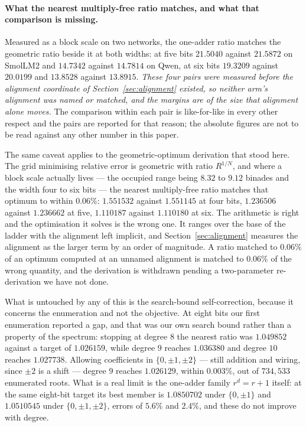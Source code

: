 \documentclass[11pt]{article}
\theoremstyle{definition}
\begin{document}
\paragraph{What the nearest multiply-free ratio matches, and what that
comparison is missing.} Measured as a block scale on two networks, the one-adder
ratio matches the geometric ratio beside it at both widths: at five bits
$21.5040$ against $21.5872$ on SmolLM2 and $14.7342$ against $14.7814$ on Qwen,
at six bits $19.3209$ against $20.0199$ and $13.8528$ against $13.8915$.
\emph{These four pairs were measured before the alignment coordinate of
Section~\ref{sec:alignment} existed, so neither arm's alignment was named or
matched, and the margins are of the size that alignment alone moves.} The
comparison within each pair is like-for-like in every other respect and the pairs
are reported for that reason; the absolute figures are not to be read against any
other number in this paper.

The same caveat applies to the geometric-optimum derivation that stood here. The
grid minimising relative error is geometric with ratio $R^{1/N}$, and where a
block scale actually lives --- the occupied range being $8.32$ to $9.12$ binades
and the width four to six bits --- the nearest multiply-free ratio matches that
optimum to within $0.06\%$: $1.551532$ against $1.551145$ at four bits,
$1.236506$ against $1.236662$ at five, $1.110187$ against $1.110180$ at six. The
arithmetic is right and the optimisation it solves is the wrong one. It ranges
over the base of the ladder with the alignment left implicit, and
Section~\ref{sec:alignment} measures the alignment as the larger term by an order
of magnitude. A ratio matched to $0.06\%$ of an optimum computed at an unnamed
alignment is matched to $0.06\%$ of the wrong quantity, and the derivation is
withdrawn pending a two-parameter re-derivation we have not done.

What is untouched by any of this is the search-bound self-correction, because it
concerns the enumeration and not the objective. At eight bits our first
enumeration reported a gap, and that was our own search bound rather than a
property of the spectrum: stopping at degree $8$ the nearest ratio was
$1.049852$ against a target of $1.026159$, while degree $9$ reaches $1.036380$
and degree $10$ reaches $1.027738$. Allowing coefficients in $\{0,\pm1,\pm2\}$
--- still addition and wiring, since $\pm2$ is a shift --- degree $9$ reaches
$1.026129$, within $0.003\%$, out of $734{,}533$ enumerated roots. What is a real
limit is the one-adder family $r^{d}=r+1$ itself: at the same eight-bit target
its best member is $1.0850702$ under $\{0,\pm1\}$ and $1.0510545$ under
$\{0,\pm1,\pm2\}$, errors of $5.6\%$ and $2.4\%$, and these do not improve with
degree.
\end{document}
